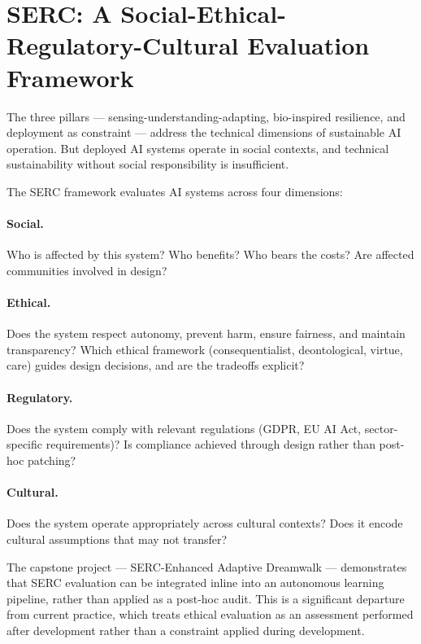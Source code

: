 \documentclass[11pt,a4paper]{article}
\begin{document}
\section{SERC: A Social-Ethical-Regulatory-Cultural Evaluation Framework}

The three pillars --- sensing-understanding-adapting, bio-inspired resilience, and deployment as constraint --- address the technical dimensions of sustainable AI operation. But deployed AI systems operate in social contexts, and technical sustainability without social responsibility is insufficient.

The SERC framework evaluates AI systems across four dimensions:

\paragraph{Social.} Who is affected by this system? Who benefits? Who bears the costs? Are affected communities involved in design?

\paragraph{Ethical.} Does the system respect autonomy, prevent harm, ensure fairness, and maintain transparency? Which ethical framework (consequentialist, deontological, virtue, care) guides design decisions, and are the tradeoffs explicit?

\paragraph{Regulatory.} Does the system comply with relevant regulations (GDPR, EU AI Act, sector-specific requirements)? Is compliance achieved through design rather than post-hoc patching?

\paragraph{Cultural.} Does the system operate appropriately across cultural contexts? Does it encode cultural assumptions that may not transfer?

The capstone project --- SERC-Enhanced Adaptive Dreamwalk --- demonstrates that SERC evaluation can be integrated inline into an autonomous learning pipeline, rather than applied as a post-hoc audit. This is a significant departure from current practice, which treats ethical evaluation as an assessment performed after development rather than a constraint applied during development.
\end{document}

